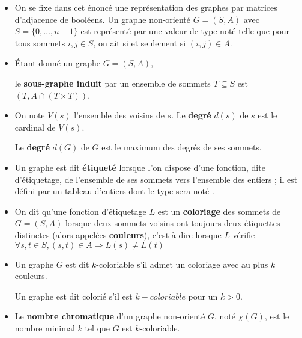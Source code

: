 \begin{itemize}
    \item On se fixe dans cet énoncé une représentation des graphes par matrices d'adjacence de booléens. Un graphe non-orienté $G = (S,A)$ avec $S= \{ 0, \dots, n-1\}$ est représenté par une valeur  de type  noté  telle que pour tous sommets $i,j \in S$, on ait  si et seulement si $(i,j) \in A$.
\item Étant donné un graphe $G = (S,A)$, 
 
 le {\bf sous-graphe induit} par un ensemble de sommets $T \subseteq S$ est $(T,A\cap (T\times T))$. 
\item On note $V(s)$ l'ensemble des voisins de $s$. Le {\bf degré} $d(s)$ de $s$ est le cardinal de $V(s)$. 
 
 Le {\bf degré} $d(G)$ de $G$ est le maximum des degrés de ses sommets. 
 \item Un graphe est dit {\bf étiqueté} lorsque l'on dispose d'une fonction, dite d'étiquetage, de l'ensemble de ses sommets vers l'ensemble des entiers ; il est défini par un tableau d'entiers dont le type sera noté .
\item On dit qu'une fonction d'étiquetage $L$ est un {\bf coloriage} des sommets de $G = (S,A)$ lorsque deux sommets voisins ont toujours deux étiquettes distinctes (alors appelées {\bf couleurs}), c'est-à-dire lorsque $L$ vérifie 
$\forall s,t \in S, (s,t) \in A \Rightarrow L(s) \ne L(t)$
\item Un graphe $G$ est dit $k$-coloriable s'il admet un coloriage avec au plus $k$ couleurs. 
 
Un graphe est dit colorié s'il est $k-coloriable$ pour un $k>0$. 
\item Le {\bf nombre chromatique} d'un graphe non-orienté $G$, noté $\chi(G)$, est le nombre minimal $k$ tel que $G$ est $k$-coloriable. 
\end{itemize}

\medskip

